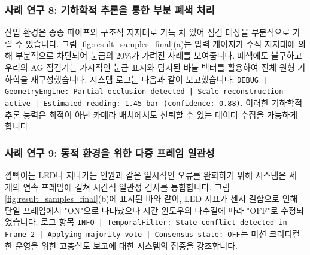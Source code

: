 \subsubsection{사례 연구 8: 기하학적 추론을 통한 부분 폐색 처리}
산업 환경은 종종 파이프와 구조적 지지대로 가득 차 있어 점검 대상을 부분적으로 가릴 수 있습니다.
그림 \ref{fig:result_samples_final}(a)는 압력 게이지가 수직 지지대에 의해 부분적으로 차단되어 눈금의 20\%가 가려진 사례를 보여줍니다.
폐색에도 불구하고 우리의 AG 점검기는 가시적인 눈금 표시와 탐지된 바늘 벡터를 활용하여 전체 원형 기하학을 재구성했습니다.
시스템 로그는 다음과 같이 보고했습니다: \texttt{DEBUG | GeometryEngine: Partial occlusion detected | Scale reconstruction active | Estimated reading: 1.45 bar (confidence: 0.88)}.
이러한 기하학적 추론 능력은 최적이 아닌 카메라 배치에서도 신뢰할 수 있는 데이터 수집을 가능하게 합니다.

\subsubsection{사례 연구 9: 동적 환경을 위한 다중 프레임 일관성}
깜빡이는 LED나 지나가는 인원과 같은 일시적인 오류를 완화하기 위해 시스템은 세 개의 연속 프레임에 걸쳐 시간적 일관성 검사를 통합합니다.
그림 \ref{fig:result_samples_final}(b)에 표시된 바와 같이, LED 지표가 센서 결함으로 인해 단일 프레임에서 "ON"으로 나타났으나 시간 윈도우의 다수결에 따라 "OFF"로 수정되었습니다.
로그 항목 \texttt{INFO | TemporalFilter: State conflict detected in Frame 2 | Applying majority vote | Consensus state: OFF}는 미션 크리티컬한 운영을 위한 고충실도 보고에 대한 시스템의 집중을 강조합니다.

